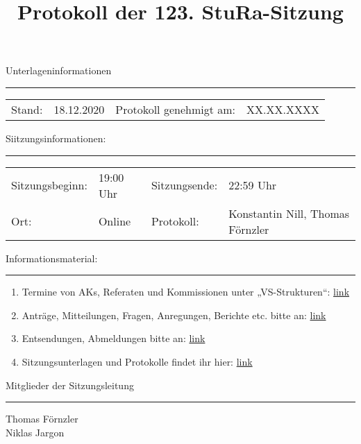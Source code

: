 \title{Protokoll der 123. StuRa-Sitzung}
\author{}
\date{\vspace{-2em}\datum\vspace{-1em}}
\maketitle

Unterlageninformationen
\vspace{.5em}\hrule
\begin{center}
    \begin{tabular}{m{2cm}m{3cm}m{4cm}m{3cm}}
        Stand: & 18.12.2020 & Protokoll genehmigt am: & XX.XX.XXXX\\
    \end{tabular}
\end{center}

Siitzungsinformationen:
\vspace{.5em}\hrule
\begin{center}
    \begin{tabular}{m{3cm}m{3cm}m{3cm}m{3cm}}
        Sitzungsbeginn: & 19:00 Uhr & Sitzungsende: & 22:59 Uhr\\
        Ort: & Online & Protokoll: & Konstantin Nill, Thomas Förnzler \\
    \end{tabular}
\end{center}

Informationsmaterial:
\vspace{.5em}\hrule\vspace{.5em}
\begin{enumerate}
    \item Termine von AKs, Referaten und Kommissionen unter „VS-Strukturen“: \href{https://www.stura.uni-heidelberg.de}{link}
    \item Anträge, Mitteilungen, Fragen, Anregungen, Berichte etc. bitte an: \href{mailto:sitzungsleitung@stura.uni-heidelberg.de}{link}
    \item Entsendungen, Abmeldungen bitte an: \href{mailto:entsendung@stura.uni-heidelberg.de}{link}
    \item Sitzungsunterlagen und Protokolle findet ihr hier: \href{https://www.stura.uni-heidelberg.de/vs-strukturen/studierendenrat/protokolle-antraege-beschluesse-der-8-legislatur/}{link}
\end{enumerate}
\vspace{1.5em}

Mitglieder der Sitzungsleitung
\vspace{.5em}\hrule\vspace{.5em}
Thomas Förnzler\\
Niklas Jargon
\pagebreak 